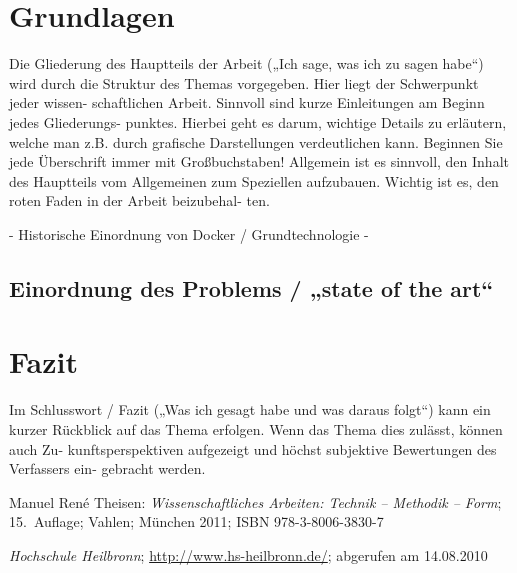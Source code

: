 \documentclass[12pt,toc=bib,toc=listof]{scrreprt}
\begin{document}

\chapter{Grundlagen} %
\label{sec:grundlagen}
Die Gliederung des Hauptteils der Arbeit („Ich sage, was ich zu sagen habe“) wird
durch die Struktur des Themas vorgegeben. Hier liegt der Schwerpunkt jeder wissen-
schaftlichen Arbeit. Sinnvoll sind kurze Einleitungen am Beginn jedes Gliederungs-
punktes. Hierbei geht es darum, wichtige Details zu erläutern, welche man z.B. durch
grafische Darstellungen verdeutlichen kann. Beginnen Sie jede Überschrift immer mit
Großbuchstaben! Allgemein ist es sinnvoll, den Inhalt des Hauptteils vom Allgemeinen
zum Speziellen aufzubauen. Wichtig ist es, den roten Faden in der Arbeit beizubehal-
ten.

- Historische Einordnung von Docker / Grundtechnologie
- 

\section{Einordnung des Problems / „state of the art“}
\label{sec:Einordnung}





\chapter{Fazit} %
\label{sec:fazit}
Im Schlusswort / Fazit („Was ich gesagt habe und was daraus folgt“) kann ein kurzer
Rückblick auf das Thema erfolgen. Wenn das Thema dies zulässt, können auch Zu-
kunftsperspektiven aufgezeigt und höchst subjektive Bewertungen des Verfassers ein-
gebracht werden.


\appendix
\begin{thebibliography}{99}
\raggedright
 Manuel René Theisen:
 \emph{Wissenschaftliches Arbeiten: Technik -- Methodik -- Form};
 15.~Auflage; Vahlen; München 2011;
 ISBN 978-3-8006-3830-7

 \emph{Hochschule Heilbronn};
 \url{http://www.hs-heilbronn.de/};
 abgerufen am 14.08.2010
\end{thebibliography}
\end{document}
